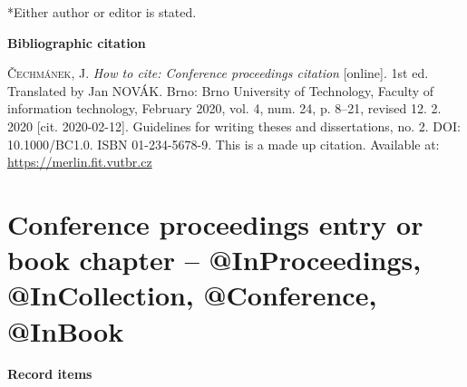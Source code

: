 *Either author or editor is stated.

\bigskip

\noindent \textbf{Bibliographic citation}

\medskip

\noindent \textsc{Čechmánek}, J. \textit{How to cite: Conference proceedings citation} [online]. 1st ed. Translated by Jan NOVÁK.
Brno: Brno University of Technology, Faculty of information technology, February 2020, vol. 4, num. 24, p. 8–21, revised 12. 2. 2020 [cit. 2020-02-12]. Guidelines for writing theses and dissertations, no. 2. DOI: 10.1000/BC1.0. ISBN 01-234-5678-9. This is a made up citation. Available at: \url{https://merlin.fit.vutbr.cz}
\newpage
\section*{Conference proceedings entry or book chapter -- @InProceedings, @InCollection, @Conference, @InBook}
\label{pr-kapitola}
\noindent \textbf{Record items}

\medskip

